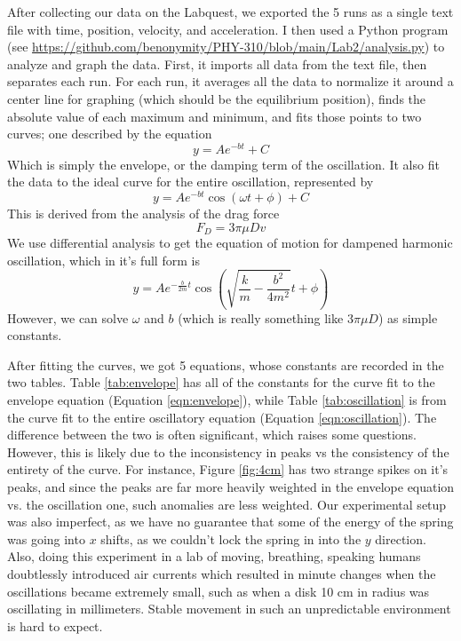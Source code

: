 \documentclass[12pt,letterpaper]{article}
\begin{document}
After collecting our data on the Labquest, we exported the 5 runs as a single text file with time, position, velocity, and acceleration. I then used a Python program (see \url{https://github.com/benonymity/PHY-310/blob/main/Lab2/analysis.py}) to analyze and graph the data. First, it imports all data from the text file, then separates each run. For each run, it averages all the data to normalize it around a center line for graphing (which should be the equilibrium position), finds the absolute value of each maximum and minimum, and fits those points to two curves; one described by the equation
\begin{equation}
    y=Ae^{-bt} + C
\label{eqn:envelope}
\end{equation}
Which is simply the envelope, or the damping term of the oscillation. It also fit the data to the ideal curve for the entire oscillation, represented by
\begin{equation}
    y=Ae^{-bt} \cos \left(\omega t + \phi\right) + C
\label{eqn:oscillation}
\end{equation}
This is derived from the analysis of the drag force 
\begin{equation}
    \label{eqn:drag}
    F_D=3\pi \mu Dv
\end{equation}
We use differential analysis to get the equation of motion for dampened harmonic oscillation, which in it's full form is
\begin{equation}
    y=Ae^{-\frac{b}{2m}t} \cos \left(\sqrt{\frac{k}{m} - \frac{b^2}{4m^2}} t + \phi\right)
\end{equation}
However, we can solve $\omega$ and $b$ (which is really something like $3\pi \mu D$) as simple constants.

After fitting the curves, we got 5 equations, whose constants are recorded in the two tables. Table \ref{tab:envelope} has all of the constants for the curve fit to the envelope equation (Equation \ref{eqn:envelope}), while Table \ref{tab:oscillation} is from the curve fit to the entire oscillatory equation (Equation \ref{eqn:oscillation}). The difference between the two is often significant, which raises some questions. However, this is likely due to the inconsistency in peaks vs the consistency of the entirety of the curve. For instance, Figure \ref{fig:4cm} has two strange spikes on it's peaks, and since the peaks are far more heavily weighted in the envelope equation vs. the oscillation one, such anomalies are less weighted. Our experimental setup was also imperfect, as we have no guarantee that some of the energy of the spring was going into $x$ shifts, as we couldn't lock the spring in into the $y$ direction. Also, doing this experiment in a lab of moving, breathing, speaking humans doubtlessly introduced air currents which resulted in minute changes when the oscillations became extremely small, such as when a disk 10 cm in radius was oscillating in millimeters. Stable movement in such an unpredictable environment is hard to expect.
\end{document}
